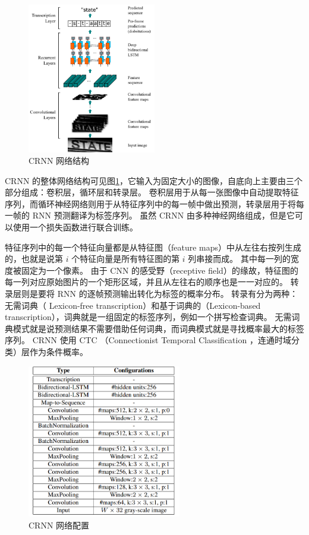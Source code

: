 \begin{figure}[h!]
	\centering
	\includegraphics[width=0.5\textwidth]{figure/resources/CRNN_arch.png}
	\caption{CRNN 网络结构\label{CRNN_arch}}
\end{figure}

CRNN 的整体网络结构可见图\ref{CRNN_arch}，它输入为固定大小的图像，自底向上主要由三个部分组成：卷积层，循环层和转录层。
卷积层用于从每一张图像中自动提取特征序列，而循环神经网络则用于从特征序列中的每一帧中做出预测，转录层用于将每一帧的 RNN 预测翻译为标签序列。
虽然 CRNN 由多种神经网络组成，但是它可以使用一个损失函数进行联合训练。

特征序列中的每一个特征向量都是从特征图（feature maps）中从左往右按列生成的，也就是说第 $i$ 个特征向量是所有特征图的第 $i$ 列串接而成。
其中每一列的宽度被固定为一个像素。
由于 CNN 的感受野（receptive field）的缘故，特征图的每一列对应原始图片的一个矩形区域，并且从左往右的顺序也是一一对应的。
转录层则是要将 RNN 的逐帧预测输出转化为标签的概率分布。
转录有分为两种：无需词典（ Lexicon-free transcription）和基于词典的（Lexicon-based transcription），词典就是一组固定的标签序列，例如一个拼写检查词典。
无需词典模式就是说预测结果不需要借助任何词典，而词典模式就是寻找概率最大的标签序列。
CRNN 使用 CTC （Connectionist Temporal Classification ，连通时域分类）层作为条件概率。

\begin{figure}[h!]
	\centering
	\includegraphics[width=0.6\textwidth]{figure/resources/CRNN_conf.png}
	\caption{CRNN 网络配置\label{CRNN_conf}}
\end{figure}

